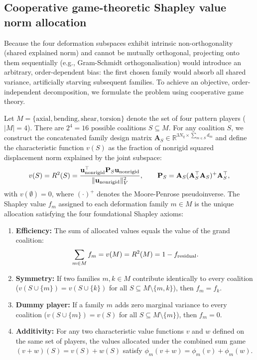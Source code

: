 \documentclass[11pt]{article}
\begin{document}
\subsection{Cooperative game-theoretic Shapley value norm allocation}
Because the four deformation subspaces exhibit intrinsic non-orthogonality (shared explained norm) and cannot be mutually orthogonal, projecting onto them sequentially (e.g., Gram-Schmidt orthogonalisation) would introduce an arbitrary, order-dependent bias: the first chosen family would absorb all shared variance, artificially starving subsequent families.
To achieve an objective, order-independent decomposition, we formulate the problem using cooperative game theory.

Let $M = \{\text{axial}, \text{bending}, \text{shear}, \text{torsion}\}$ denote the set of four pattern players ($|M| = 4$).
There are $2^4 = 16$ possible coalitions $S \subseteq M$.
For any coalition $S$, we construct the concatenated family design matrix $\mathbf A_S \in \mathbb{R}^{3N_q \times \sum_{m \in S} d_m}$ and define the characteristic function $v(S)$ as the fraction of nonrigid squared displacement norm explained by the joint subspace:
\begin{equation}
v(S) = R^2(S) = \frac{\mathbf u_{\rm nonrigid}^\top \mathbf P_S \mathbf u_{\rm nonrigid}}{\|\mathbf u_{\rm nonrigid}\|_V^2}, \qquad
\mathbf P_S = \mathbf A_S (\mathbf A_S^\top \mathbf A_S)^+ \mathbf A_S^\top,
\label{eq:coalition-r2}
\end{equation}
with $v(\emptyset) = 0$, where $(\cdot)^+$ denotes the Moore-Penrose pseudoinverse.
The Shapley value $f_m$ assigned to each deformation family $m \in M$ is the unique allocation satisfying the four foundational Shapley axioms:
\begin{enumerate}
\item \textbf{Efficiency:} The sum of allocated values equals the value of the grand coalition:
\begin{equation}
\sum_{m \in M} f_m = v(M) = R^2(M) = 1 - f_{\rm residual}.
\end{equation}
\item \textbf{Symmetry:} If two families $m, k \in M$ contribute identically to every coalition ($v(S \cup \{m\}) = v(S \cup \{k\})$ for all $S \subseteq M \setminus \{m, k\}$), then $f_m = f_k$.
\item \textbf{Dummy player:} If a family $m$ adds zero marginal variance to every coalition ($v(S \cup \{m\}) = v(S)$ for all $S \subseteq M \setminus \{m\}$), then $f_m = 0$.
\item \textbf{Additivity:} For any two characteristic value functions $v$ and $w$ defined on the same set of players, the values allocated under the combined sum game $(v + w)(S) = v(S) + w(S)$ satisfy $\phi_m(v + w) = \phi_m(v) + \phi_m(w)$.
\end{enumerate}
\end{document}
